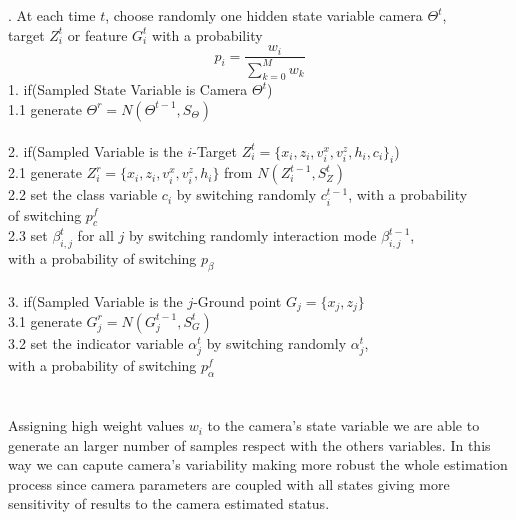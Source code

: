 {. \hspace*{0.2cm} At each time $t$, choose randomly one hidden state variable camera  $\Theta^t$,\\
\hspace*{0.9cm} target $Z_i^t$ or feature $G_i^t$ with a probability
$$
  p_i=\frac{w_i}{\sum_{k=0}^{M} w_k}
$$
1.  \hspace*{0.2cm} if(Sampled State Variable is Camera $\Theta^t$) \\
1.1 \hspace*{0.4cm} generate $\Theta^r=N(\Theta^{t-1},S_{\Theta})$\\
\\
2.  \hspace*{0.2cm} if(Sampled Variable is the $i$-Target $Z_i^t=\{x_i, z_i, v_i^x , v_i^z , h_i,c_i \}_i$) \\ 
2.1 \hspace*{0.4cm} generate $Z_i^r=\{x_i, z_i, v_i^x , v_i^z , h_i \}$ from $N(Z_i^{t-1},S_{Z}^t)$ \\
2.2 \hspace*{0.4cm} set the class variable $c_i$ by switching randomly $c_i^{t-1}$, with a probability \\ 
\hspace*{0.9cm} of switching $p_{c}^f$ \\
2.3 \hspace*{0.4cm} set $\beta_{i,j}^t$ for all $j$ by switching randomly interaction mode $\beta_{i,j}^{t-1}$, \\ 
\hspace*{0.9cm}  with a probability of switching $p_{\beta}$ \\
\\
3.  \hspace*{0.2cm} if(Sampled Variable is the $j$-Ground point $G_j=\{x_j, z_j\}$ \\
3.1 \hspace*{0.4cm} generate $G_j^r=N(G_j^{t-1},S_G^t)$ \\
3.2 \hspace*{0.4cm} set the indicator variable $\alpha_j^t$ by switching randomly $\alpha_j^t$,\\
\hspace*{0.9cm}  with a probability of switching $p_{\alpha}^f$ 
}\\[.4cm]
\\
\\
Assigning high weight values $w_i$ to the camera's state variable we are able to generate an larger number of samples respect with the others variables. In this way we can capute camera's variability making more robust the whole estimation process since camera parameters are coupled with all states giving more sensitivity of results to the camera estimated status.\\


